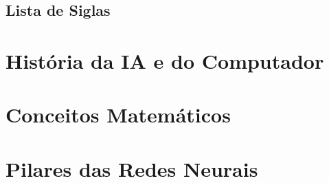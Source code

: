 \documentclass[
    12pt,            %
    a4paper,         %
    book,            %
    openright,       %
    twoside,         %
    brazil,          %
    citacao=authoryear
]{abntex2}
\begin{document}
\tableofcontents

\cleardoublepage
{}
\chapter*{Lista de Siglas}

\mainmatter

\part{História da IA e do Computador}




\part{Conceitos Matemáticos}





\part{Pilares das Redes Neurais}
\end{document}
